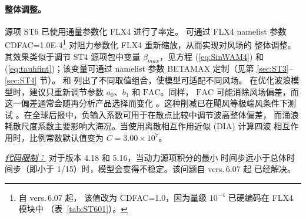 \paragraph{整体调整。} 源项 {\code ST6} 已使用通量参数化 {\code FLX4} 进行了率定。
可通过 {\F FLX4} namelist 参数 {\code CDFAC=1.0E-4}\footnote{自 vers.\,6.07 起，
该值改为 {\code CDFAC=1.0}，因为量级 $10^{-4}$ 已硬编码在 {\code FLX4} 模块中
（表~\ref{tab:ST601}）。} 对阻力参数化 {\code FLX4} 重新缩放，从而实现对风场的
整体调整。其效果类似于调节 {\code ST4} 源项包中变量 $\beta_{max}$，见方程
(\ref{eq:SinWAM4}) 和 (\ref{eq:tauhfint})；该变量可通过 namelist 参数
{\code BETAMAX} 定制（见第 \ref{sec:ST3}--\ref{sec:ST4} 节）。
\citet{pro:Aea11} 和 \citet{art:RA13} 列出了不同取值组合，使模型可适配不同风场。
在优化波浪模型时，建议只重新调节参数 $a_0$、$b_1$ 和 $\mathrm{FAC}$。同样，
$\mathrm{FAC}$ 可能消除风场偏差，而这一偏差通常会随再分析产品选择而变化
\citep[][见表~\ref{tab:ST601}]{Liu2021}。这种削减已在飓风等极端风条件下测试
\citep{art:ZBRY15}。在全球后报中，负输入系数可用于在散点比较中调节波高整体偏差，
而涌浪耗散尺度系数主要影响大海况。当使用离散相互作用近似 ({\code DIA}) 计算四波
相互作用时，比例常数默认值变为 $C=3.00\times10^7$。

\textrm{\textit{\underline{代码限制：}}} 对于版本 4.18 和 5.16，当动力源项积分的最小
时间步远小于总体时间步（即小于 1/15）时，模型会变得不稳定。该问题自 vers.\,6.07 起
已经解决。
